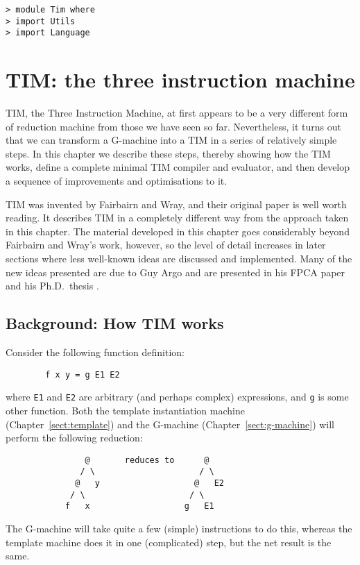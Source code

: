 
\begin{verbatim}
> module Tim where
> import Utils
> import Language
\end{verbatim}
%
%
%
\chapter{TIM: the three instruction machine}
\label{sect:tim}

TIM,
the Three Instruction Machine, at first appears to be a very different
form of reduction machine from those we have seen so far.  Nevertheless,
it turns out that we can transform a G-machine into a TIM in
a series of relatively simple steps.
In this chapter we describe these steps, thereby showing how the TIM works,
define a complete minimal
TIM compiler and evaluator, and then develop a sequence of improvements and
optimisations to it.

TIM was invented by Fairbairn and Wray, and their original paper \cite{FW87}
is well worth reading.  It describes
TIM in a completely different way from the approach taken in this chapter.
The material developed in this chapter goes considerably beyond
Fairbairn and Wray's work, however, so the level of detail increases
in later sections where less well-known ideas are discussed and implemented.
Many of the new ideas presented are due to Guy Argo
and are presented in his FPCA paper
\cite{Argo89} and his Ph.D.\ thesis \cite{ArgoThesis}.

\section{Background: How TIM works}

Consider the following function definition:
\begin{verbatim}
        f x y = g E1 E2
\end{verbatim}
where \mbox{\tt E1} and \mbox{\tt E2} are arbitrary (and perhaps complex) expressions, and
\mbox{\tt g} is some other function.
Both the template instantiation machine (Chapter~\ref{sect:template})
and the G-machine (Chapter~\ref{sect:g-machine}) will perform
the following reduction:
\begin{verbatim}
                @       reduces to      @
               / \                     / \
              @   y                   @   E2
             / \                     / \
            f   x                   g   E1
\end{verbatim}
The G-machine will take quite a few (simple) instructions to do this, whereas
the template machine does it in one (complicated) step, but the
net result is the same.


